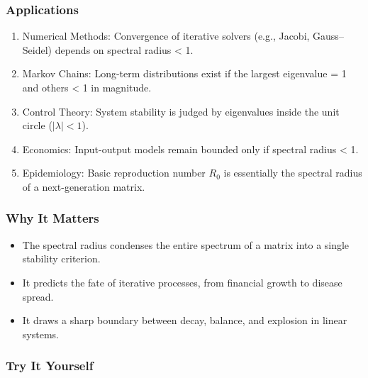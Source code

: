 \documentclass[
  letterpaper,
  DIV=11,
  numbers=noendperiod]{scrreprt}
\providecommand{\tightlist}{%
  \setlength{\itemsep}{0pt}\setlength{\parskip}{0pt}}
\begin{document}
\subsubsection{Applications}\label{applications-30}

\begin{enumerate}
\def\labelenumi{\arabic{enumi}.}
\tightlist
\item
  Numerical Methods: Convergence of iterative solvers (e.g., Jacobi,
  Gauss--Seidel) depends on spectral radius \textless{} 1.
\item
  Markov Chains: Long-term distributions exist if the largest eigenvalue
  = 1 and others \textless{} 1 in magnitude.
\item
  Control Theory: System stability is judged by eigenvalues inside the
  unit circle (\(|\lambda| < 1\)).
\item
  Economics: Input-output models remain bounded only if spectral radius
  \textless{} 1.
\item
  Epidemiology: Basic reproduction number \(R_0\) is essentially the
  spectral radius of a next-generation matrix.
\end{enumerate}

\subsubsection{Why It Matters}\label{why-it-matters-64}

\begin{itemize}
\tightlist
\item
  The spectral radius condenses the entire spectrum of a matrix into a
  single stability criterion.
\item
  It predicts the fate of iterative processes, from financial growth to
  disease spread.
\item
  It draws a sharp boundary between decay, balance, and explosion in
  linear systems.
\end{itemize}

\subsubsection{Try It Yourself}\label{try-it-yourself-67}
\end{document}
